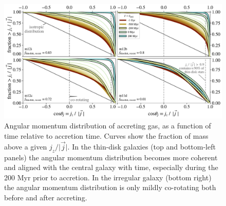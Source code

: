 \documentclass[fleqn,usenatbib]{mnras}
\begin{document}
\begin{figure}
    \centering
    \includegraphics[width=\textwidth]{figures/variations/relative_to_accretion/jzjmag_vs_t.pdf}
    \caption{
    Angular momentum distribution of accreting gas, as a function of time relative to accretion time.
    Curves show the fraction of mass above a given $j_z / \vert \vec j \vert$. 
    In the thin-disk galaxies (top and bottom-left panels) the angular momentum distribution becomes more coherent and aligned with the central galaxy with time, especially during the 200 Myr prior to accretion.
    In the irregular galaxy (bottom right) the angular momentum distribution is only mildly co-rotating  both before and after accreting. 
    }
    \label{f: coherence}
\end{figure}
\end{document}
